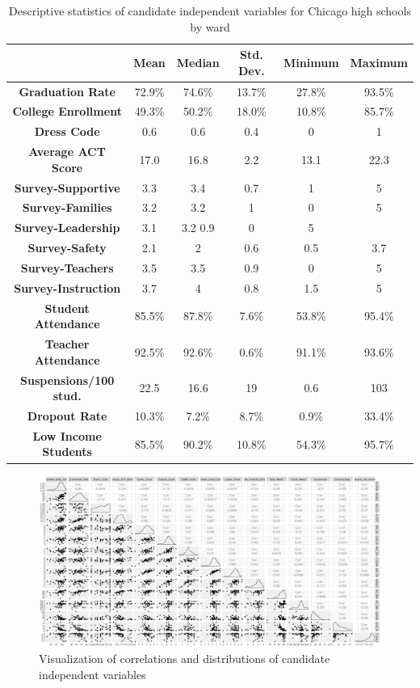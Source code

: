 \documentclass[12pt]{article}
\begin{document}
\begin{center}
	\begin{table}[h]
		\begin{tabular}{ c | c | c | c | c | c }
			
			& \textbf{Mean} & \textbf{Median} & \textbf{Std. Dev.} & \textbf{Minimum} & \textbf{Maximum} \\ 
			\hline
			\textbf{Graduation Rate} & 72.9\% & 74.6\% & 13.7\% & 27.8\% & 93.5\% \\
			\textbf{College Enrollment} & 49.3\% & 50.2\% & 18.0\% & 10.8\% & 85.7\% \\
			\textbf{Dress Code} & 0.6 & 0.6 & 0.4 & 0 & 1\\
			\textbf{Average ACT Score} & 17.0 & 16.8 & 2.2 & 13.1 & 22.3\\
			\textbf{Survey-Supportive} & 3.3 & 3.4 & 0.7 & 1 & 5\\
			\textbf{Survey-Families} & 3.2 & 3.2 & 1 & 0 & 5\\
			\textbf{Survey-Leadership} & 3.1 & 3.2 0.9 & 0 & 5\\
			\textbf{Survey-Safety} & 2.1 & 2 & 0.6 & 0.5 & 3.7\\
			\textbf{Survey-Teachers} & 3.5 & 3.5 & 0.9 & 0 & 5\\
			\textbf{Survey-Instruction} & 3.7 & 4 & 0.8 & 1.5 & 5\\
			\textbf{Student Attendance} & 85.5\% & 87.8\% & 7.6\% & 53.8\% & 95.4\% \\
			\textbf{Teacher Attendance} & 92.5\% & 92.6\% & 0.6\% & 91.1\% & 93.6\% \\
			\textbf{Suspensions/100 stud.} & 22.5 & 16.6 & 19 & 0.6 & 103\\
			\textbf{Dropout Rate} & 10.3\% & 7.2\% & 8.7\% & 0.9\% & 33.4\% \\
			\textbf{Low Income Students} & 85.5\% & 90.2\% & 10.8\% & 54.3\% & 95.7\% 
			
		\end{tabular}
		\caption{Descriptive statistics of candidate independent variables for Chicago high schools by ward}
	\end{table}
\end{center}

	\begin{figure}[h]
		\includegraphics[scale=.33]{pairplot.png}
		\caption{Visualization of correlations and distributions of candidate independent variables}
	\end{figure}
\end{document}
